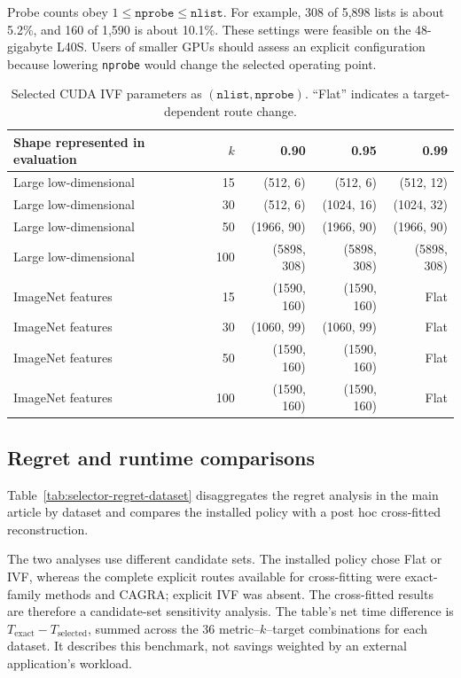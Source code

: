 \documentclass[11pt]{article}
\newcommand{\code}[1]{\texttt{#1}}
\begin{document}
Probe counts obey $1\leq\code{nprobe}\leq\code{nlist}$. For example,
308 of 5,898 lists is about 5.2\%, and 160 of 1,590 is about 10.1\%.
These settings were feasible on the 48-gigabyte L40S. Users of smaller GPUs
should assess an explicit configuration because lowering \code{nprobe} would
change the selected operating point.

\begin{table}[h]
\centering

\begin{tabularx}{\textwidth}{@{}Xrrrr@{}}
\toprule
Shape represented in evaluation & $k$ & 0.90 & 0.95 & 0.99 \\
\midrule
Large low-dimensional & 15 & (512, 6) & (512, 6) & (512, 12) \\
Large low-dimensional & 30 & (512, 6) & (1024, 16) & (1024, 32) \\
Large low-dimensional & 50 & (1966, 90) & (1966, 90) & (1966, 90) \\
Large low-dimensional & 100 & (5898, 308) & (5898, 308) & (5898, 308) \\
ImageNet features & 15 & (1590, 160) & (1590, 160) & Flat \\
ImageNet features & 30 & (1060, 99) & (1060, 99) & Flat \\
ImageNet features & 50 & (1590, 160) & (1590, 160) & Flat \\
ImageNet features & 100 & (1590, 160) & (1590, 160) & Flat \\
\bottomrule
\end{tabularx}
\caption{Selected CUDA IVF parameters as $(\code{nlist},\code{nprobe})$.
``Flat'' indicates a target-dependent route change.}
\label{tab:auto-ivf-parameters}
\end{table}

\subsection{Regret and runtime comparisons}

Table~\ref{tab:selector-regret-dataset} disaggregates the regret analysis in
the main article by dataset and compares the installed policy with a post hoc
cross-fitted reconstruction.

The two analyses use different candidate sets. The installed policy chose
Flat or IVF, whereas the complete explicit routes available for
cross-fitting were exact-family methods and CAGRA; explicit IVF was absent.
The cross-fitted results are therefore a candidate-set sensitivity analysis.
The table's net time difference is
$T_{\mathrm{exact}}-T_{\mathrm{selected}}$, summed across the 36
metric--$k$--target combinations for each dataset. It describes this benchmark,
not savings weighted by an external application's workload.
\end{document}
